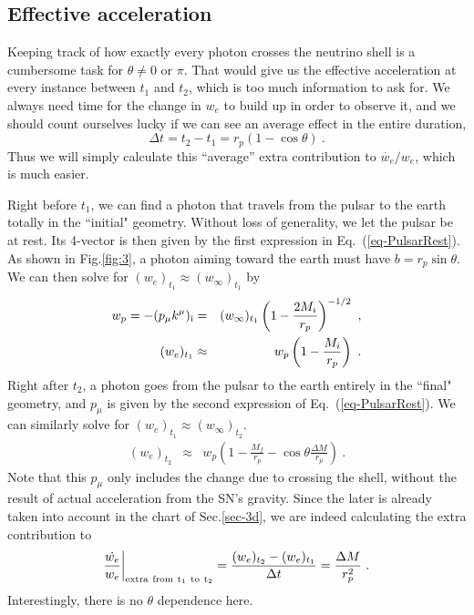 \documentclass[aps,showpacs,twocolumn,floats,prd,superscriptaddress,nofootinbib]{revtex4-1}
\begin{document}
\subsection{Effective acceleration}

Keeping track of how exactly every photon crosses the neutrino shell is a cumbersome task for $\theta\neq 0$ or $\pi$. That would give us the effective acceleration at every instance between $t_1$ and $t_2$, which is too much information to ask for. We always need time for the change in $w_e$ to build up in order to observe it, and we should count ourselves lucky if we can see an average effect in the entire duration,
\begin{equation}
\Delta t = t_2- t_1 = r_p(1-\cos\theta)~.
\end{equation}
Thus we will simply calculate this ``average'' extra contribution to $\dot{w_e}/w_e$, which is much easier.

Right before $t_1$, we can find a photon that travels from the pulsar to the earth totally in the ``initial" geometry. Without loss of generality, we let the pulsar be at rest. Its 4-vector is then given by the first expression in Eq.~(\ref{eq-PulsarRest}). As shown in Fig.\ref{fig:3}, a photon aiming toward the earth must have $b = r_p\sin\theta$. We can then solve for $(w_e)_{t_1} \approx (w_\infty)_{t_1}$ by
\begin{eqnarray}
w_p = -(p_\mu k^\mu)_{\rm i} &=& 
(w_\infty)_{t_1} \left(1-\frac{2M_i}{r_p}\right)^{-1/2}~, \nonumber \\
(w_e)_{t_1} &\approx& w_p \left(1-\frac{M_i}{r_p}\right)~.
\end{eqnarray}
Right after $t_2$, a photon goes from the pulsar to the earth entirely in the ``final" geometry, and $p_\mu$ is given by the second expression of Eq.~(\ref{eq-PulsarRest}). We can similarly solve for $(w_e)_{t_1}\approx (w_\infty)_{t_2}$. 
\begin{eqnarray}
(w_e)_{t_2} &\approx& w_p \left(1-\frac{M_f}{r_p} - \cos\theta \frac{\Delta M}{r_p}\right)~.
\end{eqnarray}
Note that this $p_\mu$ only includes the change due to crossing the shell, without the result of actual acceleration from the SN's gravity. Since the later is already taken into account in the chart of Sec.\ref{sec-3d}, we are indeed calculating the extra contribution to
\begin{equation}
\frac{\dot{w_e}}{w_e}\bigg|_{\rm extra \ from \ t_1 \ to \ t_2} = \frac{(w_e)_{t_2}-(w_e)_{t_1}}{\Delta t} = \frac{\Delta M}{r_p^2}~.
\end{equation}
Interestingly, there is no $\theta$ dependence here.
\end{document}
